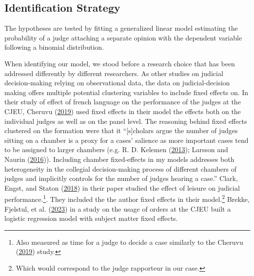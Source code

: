 \documentclass[
  11pt,
]{article}
\begin{document}
\hypertarget{identification-strategy}{%
\subsection{Identification Strategy}\label{identification-strategy}}

The hypotheses are tested by fitting a generalized linear model
estimating the probability of a judge attaching a separate opinion with
the dependent variable following a binomial distribution.

When identifying our model, we stood before a research choice that has
been addressed differently by different researchers. As other studies on
judicial decision-making relying on observational data, the data on
judicial-decision making offers multiple potential clustering variables
to include fixed effects on. In their study of effect of french language
on the performance of the judges at the CJEU, Cheruvu
(\protect\hyperlink{ref-cheruvuHowInstitutionalConstraints2019}{2019})
used fixed effects in their model the effects both on the individual
judges as well as on the panel level. The reasoning behind fixed effects
clustered on the formation were that it ``{[}s{]}cholars argue the
number of judges sitting on a chamber is a proxy for a cases' salience
as more important cases tend to be assigned to larger chambers (e.g. R.
D. Kelemen
(\protect\hyperlink{ref-kelemenPoliticalFoundationsJudicial2013}{2013});
Larsson and Naurin
(\protect\hyperlink{ref-larssonJudicialIndependencePolitical2016}{2016})).
Including chamber fixed-effects in my models addresses both
heterogeneity in the collegial decision-making process of different
chambers of judges and implicitly controls for the number of judges
hearing a case.'' Clark, Engst, and Staton
(\protect\hyperlink{ref-clarkEstimatingEffectLeisure2018}{2018}) in
their paper studied the effect of leisure on judicial
performance.\footnote{Also measured as time for a judge to decide a case
  similarly to the Cheruvu
  (\protect\hyperlink{ref-cheruvuHowInstitutionalConstraints2019}{2019})
  study.}. They included the the author fixed effects in their
model.\footnote{Which would correspond to the judge rapporteur in our
  case.} Brekke, Fjelstul, et al.
(\protect\hyperlink{ref-brekkeCJEUDatabasePlatform2023}{2023}) in a
study on the usage of orders at the CJEU built a logistic regression
model with subject matter fixed effects.
\end{document}
